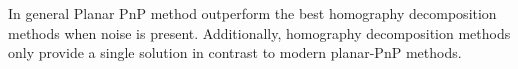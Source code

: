 \documentclass[letterpaper, 10 pt, conference]{ieeeconf}  %
\begin{document}





In general Planar PnP method outperform the best homography decomposition methods when noise is present. Additionally, homography decomposition methods only provide a single solution in contrast to modern planar-PnP methods.
\end{document}
